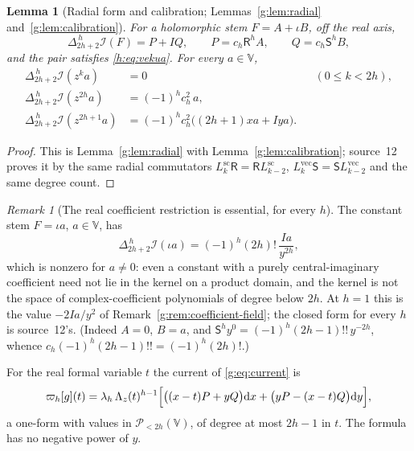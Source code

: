 \documentclass[11pt,a4paper]{article}
\numberwithin{equation}{section}
\newtheorem{lemma}[theorem]{Lemma}
\theoremstyle{definition}
\theoremstyle{remark}
\newtheorem{remark}[theorem]{Remark}
\theoremstyle{plain}
\newcommand{\I}{\mathcal I}
\newcommand{\dd}{\mathrm d}
\newcommand{\lapH}{\Delta_{2h+2}^{\,h}}
\newcommand{\VV}{\mathbb V}                       %
\newcommand{\PolH}{\mathscr P_{<2h}(\VV)}
\newcommand{\cur}{\varpi}                         %
\newcommand{\Rq}{\Lambda}                         %
\begin{document}
\begin{lemma}[Radial form and calibration; Lemmas~\ref{g:lem:radial}
and~\ref{g:lem:calibration}]\label{h:lem:radial}
For a holomorphic stem $F=A+\iota B$, off the real axis,
\begin{equation}\label{h:eq:radial}
 \lapH\I(F)=P+IQ,\qquad P=c_h\mathsf R^hA,\qquad Q=c_h\mathsf S^hB,
\end{equation}
and the pair satisfies \eqref{h:eq:vekua}. For every $a\in\VV$,
\begin{align}
 \lapH\I(z^ka)&=0 &&(0\le k<2h),\label{h:eq:cal-low}\\
 \lapH\I(z^{2h}a)&=(-1)^hc_h^2\,a,\label{h:eq:cal-even}\\
 \lapH\I(z^{2h+1}a)&=(-1)^hc_h^2\bigl((2h+1)xa+Iya\bigr).\label{h:eq:cal-odd}
\end{align}
\end{lemma}

\begin{proof}
This is Lemma~\ref{g:lem:radial} with Lemma~\ref{g:lem:calibration}; source~12
proves it by the same radial commutators $L^{\mathrm{sc}}_k\mathsf R=\mathsf
RL^{\mathrm{sc}}_{k-2}$, $L^{\mathrm{vec}}_k\mathsf S=\mathsf
SL^{\mathrm{vec}}_{k-2}$ and the same degree count.
\end{proof}

\begin{remark}[The real coefficient restriction is essential, for every $h$]
\label{h:rem:imaginary-constant}
The constant stem $F=\iota a$, $a\in\VV$, has
\[
 \lapH\I(\iota a)=(-1)^h(2h)!\,\frac{Ia}{y^{2h}},
\]
which is nonzero for $a\ne0$: even a constant with a purely central-imaginary
coefficient need not lie in the kernel on a product domain, and the kernel is
not the space of complex-coefficient polynomials of degree below $2h$. At $h=1$
this is the value $-2Ia/y^2$ of Remark~\ref{g:rem:coefficient-field}; the
closed form for every $h$ is source~12's. (Indeed $A=0$, $B=a$, and
$\mathsf S^hy^0=(-1)^h(2h-1)!!\,y^{-2h}$, whence $c_h(-1)^h(2h-1)!!=(-1)^h(2h)!$.)
\end{remark}

For the real formal variable $t$ the current of \eqref{g:eq:current} is
\begin{equation}\label{h:eq:current}
 \cur_h[g](t)=\lambda_h\,\Rq_z(t)^{h-1}\Bigl[\bigl((x-t)P+yQ\bigr)\dd x
 +\bigl(yP-(x-t)Q\bigr)\dd y\Bigr],
\end{equation}
a one-form with values in $\PolH$, of degree at most $2h-1$ in $t$. The formula
has no negative power of $y$.
\end{document}
